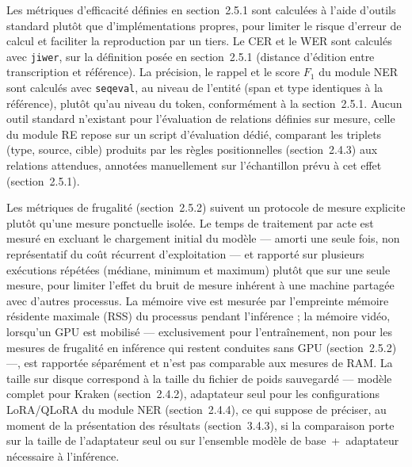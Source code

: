 Les métriques d'efficacité définies en section~2.5.1 sont calculées à l'aide
d'outils standard plutôt que d'implémentations propres, pour limiter le risque
d'erreur de calcul et faciliter la reproduction par un tiers. Le CER et le WER
sont calculés avec \texttt{jiwer}, sur la définition posée en section~2.5.1
(distance d'édition entre transcription et référence). La précision, le rappel et
le score $F_1$ du module NER sont calculés avec \texttt{seqeval}, au niveau de
l'entité (span et type identiques à la référence), plutôt qu'au niveau du token,
conformément à la section~2.5.1. Aucun outil standard n'existant pour l'évaluation
de relations définies sur mesure, celle du module RE repose sur un script
d'évaluation dédié, comparant les triplets (type, source, cible) produits par les
règles positionnelles (section~2.4.3) aux relations attendues, annotées manuellement
sur l'échantillon prévu à cet effet (section~2.5.1).

Les métriques de frugalité (section~2.5.2) suivent un protocole de mesure explicite
plutôt qu'une mesure ponctuelle isolée. Le temps de traitement par acte est mesuré
en excluant le chargement initial du modèle --- amorti une seule fois, non
représentatif du coût récurrent d'exploitation --- et rapporté sur plusieurs
exécutions répétées (médiane, minimum et maximum) plutôt que sur une seule mesure,
pour limiter l'effet du bruit de mesure inhérent à une machine partagée avec
d'autres processus. La mémoire vive est mesurée par l'empreinte mémoire résidente
maximale (RSS) du processus pendant l'inférence ; la mémoire vidéo, lorsqu'un GPU
est mobilisé --- exclusivement pour l'entraînement, non pour les mesures de
frugalité en inférence qui restent conduites sans GPU (section~2.5.2) ---, est
rapportée séparément et n'est pas comparable aux mesures de RAM. La taille sur
disque correspond à la taille du fichier de poids sauvegardé --- modèle complet
pour Kraken (section~2.4.2), adaptateur seul pour les configurations LoRA/QLoRA
du module NER (section~2.4.4), ce qui suppose de préciser, au moment de la
présentation des résultats (section~3.4.3), si la comparaison porte sur la taille
de l'adaptateur seul ou sur l'ensemble modèle de base~+~adaptateur nécessaire à
l'inférence.